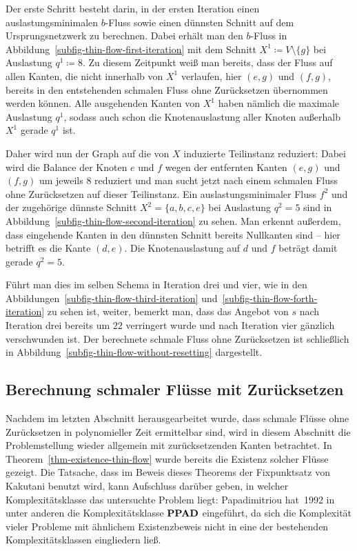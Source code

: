 \begin{example}
	Der erste Schritt besteht darin, in der ersten Iteration einen auslastungsminimalen $b$-Fluss sowie einen dünnsten Schnitt auf dem Ursprungsnetzwerk zu berechnen.
	Dabei erhält man den $b$-Fluss in Abbildung~\ref{subfig-thin-flow-first-iteration} mit dem Schnitt $X^1\coloneq V \setminus \{ g \}$ bei Auslastung $q^1 \coloneq 8$.
	Zu diesem Zeitpunkt weiß man bereits, dass der Fluss auf allen Kanten, die nicht innerhalb von $X^1$ verlaufen, hier $(e,g)$ und $(f,g)$, bereits in den entstehenden schmalen Fluss ohne Zurücksetzen übernommen werden können.
	Alle ausgehenden Kanten von $X^1$ haben nämlich die maximale Auslastung $q^1$, sodass auch schon die Knotenauslastung aller Knoten außerhalb $X^1$ gerade $q^1$ ist.

	Daher wird nun der Graph auf die von $X$ induzierte Teilinstanz reduziert:
	Dabei wird die Balance der Knoten $e$ und $f$ wegen der entfernten Kanten $(e,g)$ und $(f,g)$ um jeweils $8$ reduziert und man sucht jetzt nach einem schmalen Fluss ohne Zurücksetzen auf dieser Teilinstanz.
	Ein auslastungsminimaler Fluss $f^2$ und der zugehörige dünnste Schnitt $X^2 = \{ a, b, c, e \}$ bei Auslastung $q^2 = 5$ sind in Abbildung~\ref{subfig-thin-flow-second-iteration} zu sehen.
	Man erkennt außerdem, dass eingehende Kanten in den dünnsten Schnitt bereits Nullkanten sind -- hier betrifft es die Kante $(d,e)$.
	Die Knotenauslastung auf $d$ und $f$ beträgt damit gerade $q^2=5$.
	
	Führt man dies im selben Schema in Iteration drei und vier, wie in den Abbildungen~\ref{subfig-thin-flow-third-iteration} und~\ref{subfig-thin-flow-forth-iteration} zu sehen ist, weiter, bemerkt man, dass das Angebot von $s$ nach Iteration drei bereits um $22$ verringert wurde und nach Iteration vier gänzlich verschwunden ist.
	Der berechnete schmale Fluss ohne Zurücksetzen ist schließlich in Abbildung~\ref{subfig-thin-flow-without-resetting} dargestellt.
\end{example}

\subsection{Berechnung schmaler Flüsse mit Zurücksetzen}

\newcommand{\EndOfTheLine}{\textit{\textsc{EndOfALine}}}

Nachdem im letzten Abschnitt herausgearbeitet wurde, dass schmale Flüsse ohne Zurücksetzen in polynomieller Zeit ermittelbar sind, wird in diesem Abschnitt die Problemstellung wieder allgemein mit zurücksetzenden Kanten betrachtet.
In Theorem~\ref{thm-existence-thin-flow} wurde bereits die Existenz solcher Flüsse gezeigt.
Die Tatsache, dass im Beweis dieses Theorems der Fixpunktsatz von Kakutani benutzt wird, kann Aufschluss darüber geben, in welcher Komplexitätsklasse das untersuchte Problem liegt:
Papadimitriou hat~1992 in~\cite{PPAD1994} unter anderen die Komplexitätsklasse $\textbf{PPAD}$ eingeführt, da sich die Komplexität vieler Probleme mit ähnlichem Existenzbeweis nicht in eine der bestehenden Komplexitätsklassen eingliedern ließ.

